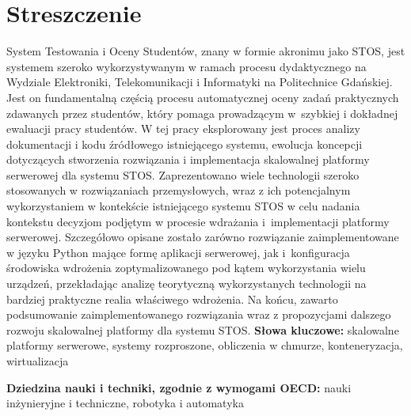 \chapter*{Streszczenie}
\indent System Testowania i Oceny Studentów, znany w formie akronimu jako STOS, jest systemem szeroko wykorzystywanym w ramach procesu dydaktycznego na Wydziale Elektroniki, Telekomunikacji i Informatyki na Politechnice Gdańskiej. Jest on fundamentalną częścią procesu automatycznej oceny zadań praktycznych zdawanych przez studentów, który pomaga prowadzącym w~szybkiej i dokładnej ewaluacji pracy studentów. 
\newline \noindent W tej pracy eksplorowany jest proces analizy dokumentacji i kodu źródłowego istniejącego systemu, ewolucja koncepcji dotyczących stworzenia rozwiązania i implementacja skalowalnej platformy serwerowej dla systemu STOS. Zaprezentowano wiele technologii szeroko stosowanych w rozwiązaniach przemysłowych, wraz z ich potencjalnym wykorzystaniem w kontekście istniejącego systemu STOS w celu nadania kontekstu decyzjom podjętym w procesie wdrażania i~implementacji platformy serwerowej. Szczegółowo opisane zostało zarówno rozwiązanie zaimplementowane w języku Python mające formę aplikacji serwerowej, jak i~konfiguracja środowiska wdrożenia zoptymalizowanego pod kątem wykorzystania wielu urządzeń, przekładając analizę teorytyczną wykorzystanych technologii na bardziej praktyczne realia właściwego wdrożenia. Na końcu, zawarto podsumowanie zaimplementowanego rozwiązania wraz z propozycjami dalszego rozwoju skalowalnej platformy dla systemu STOS.
\vspace{0.5cm}\newline
\textbf{Słowa kluczowe:} skalowalne platformy serwerowe, systemy rozproszone, obliczenia w chmurze, konteneryzacja, wirtualizacja\vspace{0.5cm}

\noindent \textbf{Dziedzina nauki i techniki, zgodnie z wymogami OECD:} nauki inżynieryjne i techniczne, robotyka i automatyka
